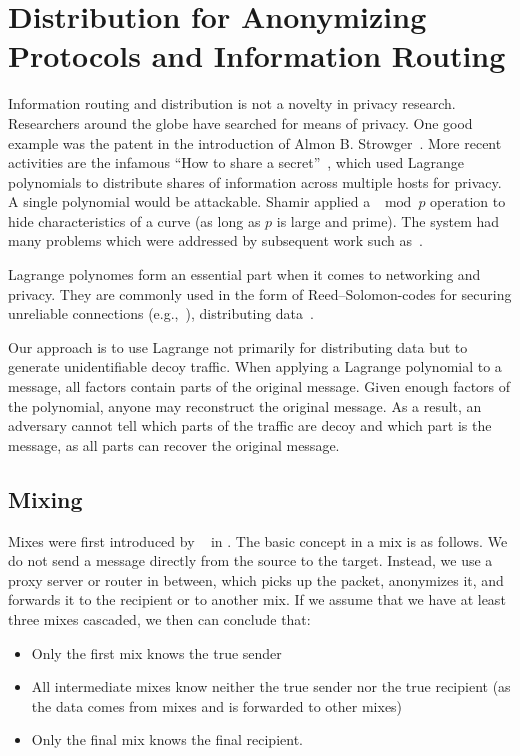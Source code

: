\chapter[Information in Anonymizing Protocols]{Distribution for Anonymizing Protocols and Information Routing}\label{sec:informationHiding}
Information routing and distribution is not a novelty in privacy research. Researchers around the globe have searched for means of privacy. One good example was the patent in the introduction of Almon B. Strowger~\cite{pulseDialingPatent}. More recent activities are the infamous ``How to share a secret''~\cite{shamir1979share}, which used Lagrange polynomials to distribute shares of information across multiple hosts for privacy. A single polynomial would be attackable. Shamir applied a $\mod p$ operation to hide characteristics of a curve (as long as $p$ is large and prime). The system had many problems which were addressed by subsequent work such as~\cite{tompa1989share}.

Lagrange polynomes form an essential part when it comes to networking and privacy. They are commonly used in the form of Reed--Solomon-codes for securing unreliable connections (e.g.,~\cite{aiache2008reed}), distributing data~\cite{shamir1979share}.

Our approach is to use Lagrange not primarily for distributing data but to generate unidentifiable decoy traffic. When applying a Lagrange polynomial to a message, all factors contain parts of the original message. Given enough factors of the polynomial, anyone may reconstruct the original message. As a result, an adversary cannot tell which parts of the traffic are decoy and which part is the message, as all parts can recover the original message.

\section{Mixing}\label{sec:mixNets}
Mixes were first introduced by ~\cite{CHAUM1} in \citeyear{CHAUM1}. The basic concept in a mix is as follows. We do not send a message directly from the source to the target. Instead, we use a proxy server or router in between, which picks up the packet, anonymizes it, and forwards it to the recipient or to another mix. If we assume that we have at least three mixes cascaded, we then can conclude that:
\begin{itemize}
	\item Only the first mix knows the true sender
	\item All intermediate mixes know neither the true sender nor the true recipient (as the data comes from mixes and is forwarded to other mixes) 
	\item Only the final mix knows the final recipient.
\end{itemize}

